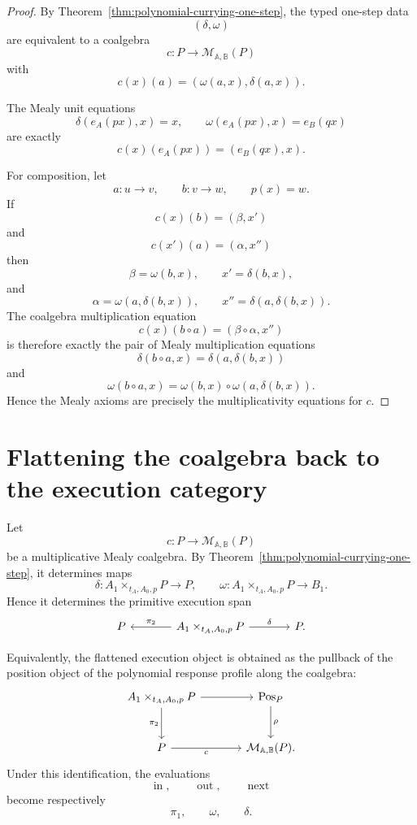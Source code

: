 \begin{proof}
By Theorem~\ref{thm:polynomial-currying-one-step}, the typed one-step data
\[
(\delta,\omega)
\]
are equivalent to a coalgebra
\[
c:P\to\mathcal M_{\mathbb A,\mathbb B}(P)
\]
with
\[
c(x)(a)=(\omega(a,x),\delta(a,x)).
\]

The Mealy unit equations
\[
\delta(e_A(px),x)=x,
\qquad
\omega(e_A(px),x)=e_B(qx)
\]
are exactly
\[
c(x)(e_A(px))=(e_B(qx),x).
\]

For composition, let
\[
a:u\to v,
\qquad
b:v\to w,
\qquad
p(x)=w.
\]
If
\[
c(x)(b)=(\beta,x')
\]
and
\[
c(x')(a)=(\alpha,x'')
\]
then
\[
\beta=\omega(b,x),
\qquad
x'=\delta(b,x),
\]
and
\[
\alpha=\omega(a,\delta(b,x)),
\qquad
x''=\delta(a,\delta(b,x)).
\]
The coalgebra multiplication equation
\[
c(x)(b\circ a)=(\beta\circ\alpha,x'')
\]
is therefore exactly the pair of Mealy multiplication equations
\[
\delta(b\circ a,x)
=
\delta(a,\delta(b,x))
\]
and
\[
\omega(b\circ a,x)
=
\omega(b,x)\circ\omega(a,\delta(b,x)).
\]
Hence the Mealy axioms are precisely the multiplicativity equations for
\(c\).
\end{proof}

\section{Flattening the coalgebra back to the execution category}
\label{sec:flattening-coalgebra-execution-category}

Let
\[
c:P\to\mathcal M_{\mathbb A,\mathbb B}(P)
\]
be a multiplicative Mealy coalgebra. By
Theorem~\ref{thm:polynomial-currying-one-step}, it determines maps
\[
\delta:
A_1\times_{t_A,A_0,p}P\to P,
\qquad
\omega:
A_1\times_{t_A,A_0,p}P\to B_1.
\]
Hence it determines the primitive execution span
\[
\begin{tikzcd}[column sep=large]
P
&
A_1\times_{t_A,A_0,p}P
  \arrow[l, "\pi_2"']
  \arrow[r, "\delta"]
&
P .
\end{tikzcd}
\]

Equivalently, the flattened execution object is obtained as the pullback
of the position object of the polynomial response profile along the
coalgebra:
\[
\begin{tikzcd}[column sep=large,row sep=large]
A_1\times_{t_A,A_0,p}P
  \arrow[r]
  \arrow[d, "\pi_2"']
&
\mathrm{Pos}_P
  \arrow[d, "\rho"]
\\
P
  \arrow[r, "c"']
&
\mathcal M_{\mathbb A,\mathbb B}(P).
\end{tikzcd}
\]
Under this identification, the evaluations
\[
\operatorname{in},
\qquad
\operatorname{out},
\qquad
\operatorname{next}
\]
become respectively
\[
\pi_1,
\qquad
\omega,
\qquad
\delta.
\]

